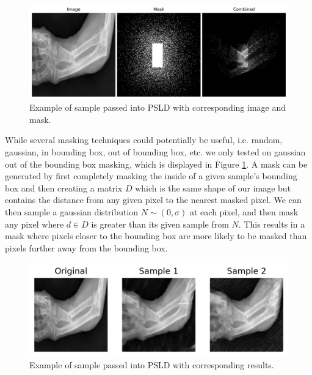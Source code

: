\documentclass{article}
\begin{document}
\begin{figure}[ht]
    \vskip -0.1in
    \begin{center}
        \centerline{\includegraphics[width=\columnwidth]{Mask.png}}
        \caption{Example of sample passed into PSLD with corresponding image and mask.}
        \label{psld_mask}
    \end{center}
    \vskip -0.3in
\end{figure}

While several masking techniques could potentially be useful, i.e. random, gaussian, in bounding box, out of bounding box, etc. we only tested on
gaussian out of the bounding box masking, which is displayed in Figure \ref{psld_mask}. A mask can be generated by first completely masking the inside 
of a given sample's bounding box and then creating 
a matrix $D$ which is the same shape of our image but contains the distance from any given pixel to the nearest masked pixel. We can then sample a gaussian
distribution $N \sim (0, \sigma)$ at each pixel, and then mask any pixel where $d \in D$ is greater than its given sample from $N$. This results in a mask where pixels
closer to the bounding box are more likely to be masked than pixels further away from the bounding box. 

\begin{figure}[ht]
    \vskip -0.1in
    \begin{center}
        \centerline{\includegraphics[width=\columnwidth]{psld_results.png}}
        \caption{Example of sample passed into PSLD with corresponding results.}
        \label{psld_results}
    \end{center}
    \vskip -0.3in
\end{figure}
\end{document}
